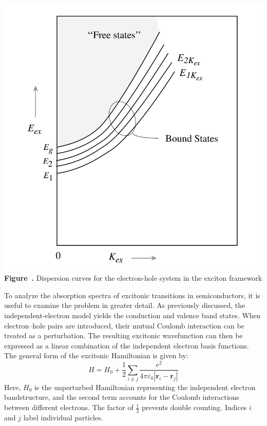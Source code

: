 \begin{center}
	\begin{minipage}{0.6\textwidth}
		\centering
		\includegraphics[width=\textwidth]{img/Dispersion_curves.png}
		\\[0.5em]
		\textbf{Figure~\thefigure.} Dispersion curves for the electron-hole system in the exciton framework
		\label{fig:Dispersion_curves}
	\end{minipage}
\end{center}
To analyze the absorption spectra of excitonic transitions in semiconductors, it is useful to examine the problem in greater detail. As previously discussed, the independent-electron model yields the conduction and valence band states. When electron–hole pairs are introduced, their mutual Coulomb interaction can be treated as a perturbation. The resulting excitonic wavefunction can then be expressed as a linear combination of the independent electron basis functions.\\
The general form of the excitonic Hamiltonian is given by:
\begin{equation}
	H = H_0 + \frac{1}{2} \sum_{i \neq j} \frac{e^2}{4\pi \varepsilon_0 |\mathbf{r}_i - \mathbf{r}_j|}
\end{equation}
Here, \( H_0 \) is the unperturbed Hamiltonian representing the independent electron bandstructure, and the second term accounts for the Coulomb interactions between different electrons. The factor of \( \frac{1}{2} \) prevents double counting. Indices \( i \) and \( j \) label individual particles.\\
